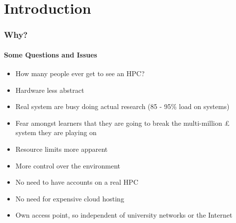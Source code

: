 \section{Introduction}

\begin{frame}
	\frametitle{Why?}
	\framesubtitle{Some Questions and Issues}
	\begin{itemize}
		\item How many people ever get to see an HPC?
		\item Hardware less abstract
		\item Real system are busy doing actual research (85 - 95\% load on systems)
		\item Fear amongst learners that they are going to break the multi-million £ system they are playing on
		\item Resource limits more apparent
		\item More control over the environment
		\item No need to have accounts on a real HPC
		\item No need for expensive cloud hosting
		\item Own access point, so independent of university networks or the Internet
	\end{itemize}
\end{frame}